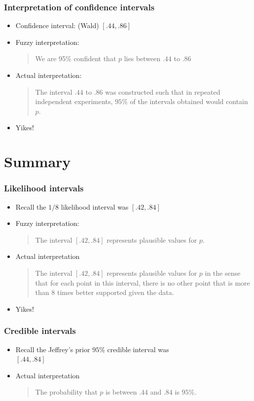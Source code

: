 \documentclass[aspectratio=169]{beamer}
\begin{document}
\begin{frame}\frametitle{Interpretation of confidence intervals}
\begin{itemize}
\item Confidence interval: (Wald) $[.44, .86]$
\item Fuzzy interpretation: 
  \begin{quote}
We are 95\% confident that $p$ lies between $.44$ to $.86$    
  \end{quote}
\item Actual interpretation: 
  \begin{quote}
    The interval $.44$ to $.86$ was constructed such that in repeated
    independent experiments, $95\%$ of the intervals obtained would
    contain $p$.
  \end{quote}
\item Yikes!
\end{itemize}
\end{frame}

\section{Summary}
\begin{frame}\frametitle{Likelihood intervals}
\begin{itemize}
\item Recall the $1/8$ likelihood interval was $[.42, .84]$
\item Fuzzy interpretation:
  \begin{quote}
    The interval $[.42, .84]$ represents plausible values for $p$.
  \end{quote}
\item Actual interpretation
  \begin{quote}
    The interval $[.42, .84]$ represents plausible values for $p$ in
    the sense that for each point in this interval, there is no
    other point that is more than $8$ times better supported given the data.
  \end{quote}
\item Yikes!
\end{itemize}
\end{frame}

\begin{frame}\frametitle{Credible intervals}
\begin{itemize}
\item Recall the Jeffrey's prior $95\%$ credible interval was \\$[.44, .84]$
\item Actual interpretation
  \begin{quote}
    The probability that $p$ is between $.44$ and $.84$ is $95\%$.
  \end{quote}
\end{itemize}
\end{frame}
\end{document}
